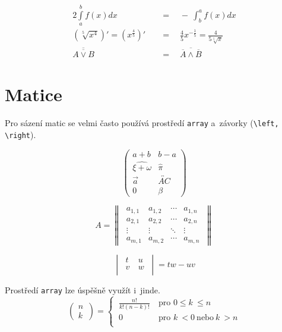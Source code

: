 \documentclass[a4paper, 11pt, times]{article}
\theoremstyle{definition}
\theoremstyle{theorem}
\theoremstyle{remark}
\begin{document}
\begin{twocolumn}
\begin{alignat}{2}
 \int\limits_a^b f(x)dx \quad&=\quad -\ \int_b^a f(x)dx \\
 \left(\sqrt[5]{x^4}\right)' = \left(x^\frac{4}{5}\right)' \quad&=\quad \frac{4}{5}x^{-\frac{1}{5}} = \frac{4}{5\sqrt[5]{x}} \\
 \overline{\overline{A \vee B}} \quad&=\quad \overline{\overline{A} \wedge \overline{B}}
\end{alignat}

  
\section{Matice}
Pro sázení matic se velmi často používá prostředí \verb|array| a~závorky (\verb|\left, \right|).

\begin{equation*}
  \begin{pmatrix}
    a+b & b-a  \\
    \widehat{\xi + \omega} & \hat{\pi} \\
    \vec{a} & \overleftrightarrow{AC}  \\
    0 & \beta
  \end{pmatrix}
\end{equation*}

\begin{equation*}
A=
  \begin{Vmatrix}
  \ a_{1,1} & a_{1,2} & \cdots & a_{1,n} \ \\
  \ a_{2,1} & a_{2,2} & \cdots & a_{2,n} \ \\
  \ \vdots  & \vdots  & \ddots & \vdots  \ \\
  \ a_{m,1} & a_{m,2} & \cdots & a_{m,n} \
  \end{Vmatrix}
\end{equation*}

\begin{equation*}
  \begin{vmatrix}
    \ t & u\  \\
    \ v~& w \ \\
  \end{vmatrix}
  = tw - uv
\end{equation*}

Prostředí \verb|array| lze úspěšně využít i~jinde.
\begin{equation*}
\left(\!
  \begin{array}{c}
    n \\
    k~\end{array}
\!\right) =
    \begin{cases}
      \ \frac{n!}{k!(n-k)!}       & \ \text{pro } 0 \le k~\le n\\
      \  0                        & \ \text{pro } k~< 0 \ \text{nebo}\ k~> n\\
    \end{cases}
\end{equation*}



\end{twocolumn}
\end{document}

